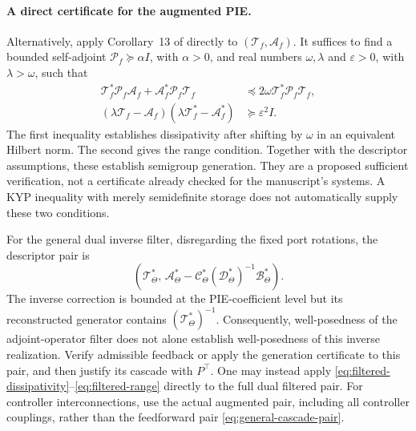\documentclass[11pt,a4paper]{article}
\begin{document}
\paragraph{A direct certificate for the augmented PIE.}
Alternatively, apply Corollary~13 of \cite{jagt} directly to
$(\mathcal T_f,\mathcal A_f)$. It suffices to find a bounded self-adjoint
$\mathcal P_f\succeq\alpha I$, with $\alpha>0$, and real numbers
$\omega,\lambda$ and $\varepsilon>0$, with $\lambda>\omega$, such that
\begin{align}
 \mathcal T_f^*\mathcal P_f\mathcal A_f
 +\mathcal A_f^*\mathcal P_f\mathcal T_f
 &\preceq2\omega\mathcal T_f^*\mathcal P_f\mathcal T_f,
 \label{eq:filtered-dissipativity}\\
 (\lambda\mathcal T_f-\mathcal A_f)
 (\lambda\mathcal T_f^*-\mathcal A_f^*)
 &\succeq\varepsilon^2I.\label{eq:filtered-range}
\end{align}
The first inequality establishes dissipativity after shifting by
$\omega$ in an equivalent Hilbert norm. The second gives the range
condition. Together with the descriptor assumptions, these establish
semigroup generation. They are a proposed sufficient verification, not
a certificate already checked for the manuscript's systems. A KYP
inequality with merely semidefinite storage does not automatically
supply these two conditions.

For the general dual inverse filter, disregarding the fixed port
rotations, the descriptor pair is
\[
 \left(\mathcal T_\Theta^*,\,
 \mathcal A_\Theta^*
 -\mathcal C_\Theta^*(\mathcal D_\Theta^*)^{-1}
       \mathcal B_\Theta^*\right).
\]
The inverse correction is bounded at the PIE-coefficient level but its
reconstructed generator contains $(\mathcal T_\Theta^*)^{-1}$.
Consequently, well-posedness of the adjoint-operator filter does not
alone establish well-posedness of this inverse realization. Verify
admissible feedback or apply the generation certificate to this pair,
and then justify its cascade with $P^\top$. One may instead apply
\eqref{eq:filtered-dissipativity}--\eqref{eq:filtered-range} directly to
the full dual filtered pair. For controller interconnections, use the
actual augmented pair, including all controller couplings, rather than
the feedforward pair \eqref{eq:general-cascade-pair}.
\end{document}
